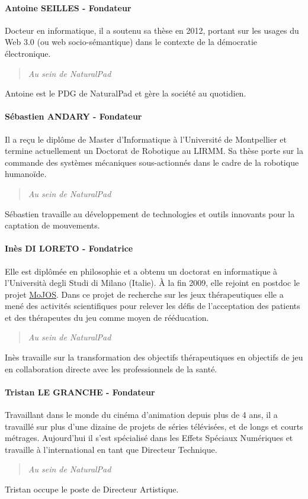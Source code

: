 		\paragraph{Antoine SEILLES - Fondateur\\}
Docteur en informatique, il a soutenu sa thèse en 2012, portant sur les usages du Web 3.0 (ou web socio-sémantique) dans le contexte de la démocratie électronique. 
		\begin{quotation} \emph{Au sein de NaturalPad} \end{quotation}
Antoine est le PDG de NaturalPad et gère la société au quotidien.

		\paragraph{Sébastien ANDARY - Fondateur\\}
Il a reçu le diplôme de Master d’Informatique à l’Université de Montpellier et termine actuellement un Doctorat de Robotique au LIRMM. Sa thèse porte sur la commande des systèmes mécaniques sous-actionnés dans le cadre de la robotique humanoïde. 
		\begin{quotation} \emph{Au sein de NaturalPad} \end{quotation}
Sébastien travaille au développement de technologies et outils innovants pour la captation de mouvements.

		\paragraph{Inès DI LORETO - Fondatrice\\}
Elle est diplômée en philosophie et a obtenu un doctorat en informatique à l’Università degli Studi di Milano (Italie). À la fin 2009, elle rejoint en postdoc le projet \href{http://www.mojos.fr}{MoJOS}. Dans ce projet de recherche sur les jeux thérapeutiques elle a mené des activités scientifiques pour relever les défis de l’acceptation des patients et des thérapeutes du jeu comme moyen de rééducation. 
		\begin{quotation} \emph{Au sein de NaturalPad} \end{quotation}
Inès travaille sur la transformation des objectifs thérapeutiques en objectifs de jeu en collaboration directe avec les professionnels de la santé.

		\paragraph{Tristan LE GRANCHE - Fondateur\\}
Travaillant dans le monde du cinéma d’animation depuis plus de 4 ans, il a travaillé sur plus d’une dizaine de projets de séries télévisées, et de longs et courts métrages. Aujourd’hui il s’est spécialisé dans les Effets Spéciaux Numériques et travaille à l’international en tant que Directeur Technique.
		\begin{quotation} \emph{Au sein de NaturalPad} \end{quotation}
Tristan occupe le poste de Directeur Artistique.
	
